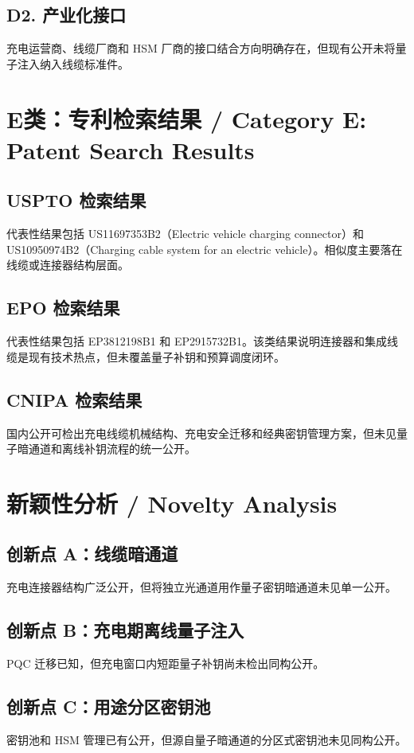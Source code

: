 ﻿\documentclass[12pt,a4paper]{article}
\begin{document}
\subsection{D2. 产业化接口}
充电运营商、线缆厂商和 HSM 厂商的接口结合方向明确存在，但现有公开未将量子注入纳入线缆标准件。

\section{E类：专利检索结果 / Category E: Patent Search Results}
\subsection{USPTO 检索结果}
代表性结果包括 US11697353B2（Electric vehicle charging connector）和 US10950974B2（Charging cable system for an electric vehicle）。相似度主要落在线缆或连接器结构层面。

\subsection{EPO 检索结果}
代表性结果包括 EP3812198B1 和 EP2915732B1。该类结果说明连接器和集成线缆是现有技术热点，但未覆盖量子补钥和预算调度闭环。

\subsection{CNIPA 检索结果}
国内公开可检出充电线缆机械结构、充电安全迁移和经典密钥管理方案，但未见量子暗通道和离线补钥流程的统一公开。

\section{新颖性分析 / Novelty Analysis}
\subsection{创新点 A：线缆暗通道}
充电连接器结构广泛公开，但将独立光通道用作量子密钥暗通道未见单一公开。

\subsection{创新点 B：充电期离线量子注入}
PQC 迁移已知，但充电窗口内短距量子补钥尚未检出同构公开。

\subsection{创新点 C：用途分区密钥池}
密钥池和 HSM 管理已有公开，但源自量子暗通道的分区式密钥池未见同构公开。
\end{document}
